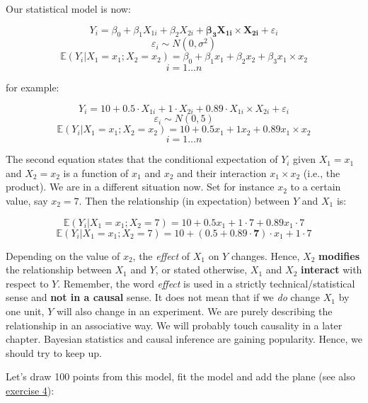 \documentclass[
]{book}
\begin{document}
Our statistical model is now:

\[ Y_i = \beta_0 + \beta_1 X_{1i} + \beta_2 X_{2i} + \mathbf{\beta_3 X_{1i} \times X_{2i}} + \varepsilon_i\]
\[ \varepsilon_i \sim N(0, \sigma^2)\]
\[ \mathbb{E}(Y_i|X_1 = x_1; X_2 = x_2) = \beta_0 + \beta_1 x_{1} + \beta_2 x_{2} + \beta_3 x_{1} \times x_{2}\]
\[ i = 1 \ldots n\]

for example:

\[ Y_i = 10 + 0.5 \cdot X_{1i} + 1 \cdot X_{2i} + 0.89 \cdot X_{1i} \times X_{2i} + \varepsilon_i\]
\[ \varepsilon_i \sim N(0, 5)\]
\[ \mathbb{E}(Y_i|X_1 = x_1; X_2 = x_2) = 10 + 0.5 x_1 + 1 x_2 + 0.89 x_1 \times x_2\]
\[ i = 1 \ldots n\]

The second equation states that the conditional expectation of \(Y_i\) given \(X_1=x_1\) and \(X_2=x_2\)
is a function of \(x_1\) and \(x_2\) and their interaction \(x_1 \times x_2\) (i.e., the product). We are in a different situation now.
Set for instance \(x_2\) to a certain value, say \(x_2 = 7\). Then the relationship (in expectation)
between \(Y\) and \(X_1\) is:

\[ \mathbb{E}(Y_i|X_1 = x_1; X_2 = 7) = 10 + 0.5 x_1 + 1 \cdot 7 + 0.89 x_1 \cdot 7\]
\[ \mathbb{E}(Y_i|X_1 = x_1; X_2 = 7) = 10 + (0.5 + 0.89 \cdot \mathbf{7}) \cdot x_1 + 1 \cdot 7\]

Depending on the value of \(x_2\), the \emph{effect} of \(X_1\) on \(Y\) changes.
Hence, \(X_2\) \textbf{modifies} the relationship between \(X_1\) and \(Y\), or stated otherwise,
\(X_1\) and \(X_2\) \textbf{interact} with respect to \(Y\). Remember, the word \emph{effect} is
used in a strictly technical/statistical sense and \textbf{not in a causal} sense.
It does not mean that if we \emph{do} change \(X_1\) by one unit,
\(Y\) will also change in an experiment. We are purely describing the relationship
in an associative way. We will probably touch causality in a later chapter.
Bayesian statistics and causal inference are gaining popularity. Hence, we should try to keep up.

Let's draw 100 points from this model, fit the model and add the plane (see also \hyperref[exercise3_multiple_regression]{exercise 4}):
\end{document}
